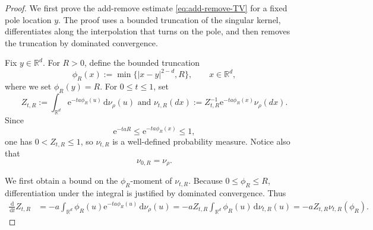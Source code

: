 \documentclass[10pt,a4paper]{amsart}
\newcommand{\R}{\mathbb R}
\newcommand{\dd}{\,\mathrm d}
\newcommand{\ee}{\mathrm e}
\begin{document}
\begin{proof}
We first prove the add-remove estimate \eqref{eq:add-remove-TV} for a fixed
pole location \(y\).  The proof uses a bounded truncation of the singular
kernel, differentiates along the interpolation that turns on the pole, and
then removes the truncation by dominated convergence.

Fix \(y\in\R^d\).  For \(R>0\), define the bounded truncation
\[
 \phi_R(x):=\min\{|x-y|^{2-d},R\},
 \qquad x\in\R^d,
\]
where we set \(\phi_R(y)=R\).  For \(0\le t\le1\), set
\[
 Z_{t,R}
 :=
 \int_{\R^d}\ee^{-ta\phi_R(u)}\dd\nu_\rho(u) \text{ and }
 \nu_{t,R}(d x)
 :=
 Z_{t,R}^{-1}\ee^{-ta\phi_R(x)}\nu_\rho(d x).
\]
Since
\[
 \ee^{-taR}\le \ee^{-ta\phi_R(x)}\le1,
\]
one has \(0<Z_{t,R}\le1\), so \(\nu_{t,R}\) is a well-defined
probability measure.  Notice also that
\[
 \nu_{0,R}=\nu_\rho.
\]

We first obtain a bound on the \(\phi_R\)-moment of \(\nu_{t,R}\).
Because \(0\le\phi_R\le R\), differentiation under the integral is
justified by dominated convergence.  Thus
\begin{align*}
 \frac{\dd}{\dd t}Z_{t,R}
 &=-a\int_{\R^d}\phi_R(u)\ee^{-ta\phi_R(u)}
   \dd\nu_\rho(u)=-aZ_{t,R}\int_{\R^d}\phi_R(u)\dd\nu_{t,R}(u)
  =-aZ_{t,R}\nu_{t,R}(\phi_R).
\end{align*}


\end{proof}
\end{document}
